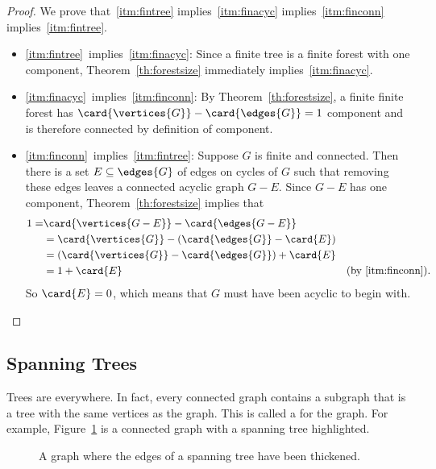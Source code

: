 \begin{proof}
We prove that~\eqref{itm:fintree} implies~\eqref{itm:finacyc}
implies~\eqref{itm:finconn} implies~\eqref{itm:fintree}.

\begin{itemize}
\item \eqref{itm:fintree}~implies~\eqref{itm:finacyc}: Since a finite
  tree is a finite forest with one component,
  Theorem~\ref{th:forestsize} immediately implies~\eqref{itm:finacyc}.

\item \eqref{itm:finacyc}~implies~\eqref{itm:finconn}: By
  Theorem~\ref{th:forestsize}, a finite finite forest has
  $\card{\vertices{G}} - \card{\edges{G}}=1$ component and is
  therefore connected by definition of component.

\item \eqref{itm:finconn}~implies~\eqref{itm:fintree}: Suppose $G$ is
  finite and connected.  Then there is a set $E \subseteq \edges{G}$
  of edges on cycles of $G$ such that removing these edges leaves a
  connected acyclic graph $G - E$.  Since $G-E$ has one component,
  Theorem~\ref{th:forestsize} implies that
\begin{align*}
  1 = & \card{\vertices{G-E}} - \card{\edges{G-E}}\\
      & = \card{\vertices{G}} - (\card{\edges{G}}- \card{E})\\
      & = (\card{\vertices{G}} - \card{\edges{G}}) + \card{E}\\
      & = 1 + \card{E}
           & \text{(by \eqref{itm:finconn})}.
\end{align*}
So $\card{E} = 0$, which means that $G$ must have been acyclic to
begin with.
\end{itemize}

\end{proof}

\subsection{Spanning Trees}\label{spantree_subsec}
Trees are everywhere.  In fact, every connected graph contains a
subgraph that is a tree with the same vertices as the graph.  This is
called a  for the graph.  For example,
Figure~\ref{fig:5LL} is a connected graph with a spanning tree
highlighted.

\begin{figure}
\caption{A graph where the edges of a spanning tree have been
  thickened.}
\label{fig:5LL}
\end{figure}

